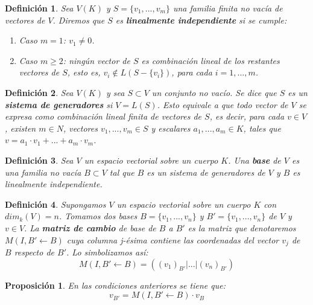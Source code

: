 \documentclass[a4paper,11pt, oneside]{book}
\newtheorem{defi}{Definición}
\newtheorem{prop}{Proposición}
\begin{document}
\begin{defi}
	Sea $V(K)$ y $S = \{v_1,...,v_m\}$ una familia finita no vacía de vectores de $V$. Diremos que $S$ es \textbf{linealmente independiente} si se cumple:
	\begin{enumerate}
		\item Caso $m=1$: $v_1 \neq 0$.
		\item Caso $m \geq 2$: ningún vector de $S$ es combinación lineal de los restantes vectores de $S$, esto es, $v_i \notin L(S -\{v_i\})$, para cada $i=1,...,m$.
	\end{enumerate}
\end{defi}
\begin{defi}
	Sea $V(K)$ y sea $S \subset V$ un conjunto no vacío. Se dice que $S$ es un \textbf{sistema de generadores} si $V = L(S)$. Esto equivale a que todo vector de $V$ se expresa como combinación lineal finita de vectores de $S$, es decir, para cada $v \in V$, existen $m \in N$, vectores $v_1,...,v_m \in S$ y escalares $a_1,...,a_m \in K$, tales que $v = a_1\cdot v_1+...+a_m\cdot v_m$.
\end{defi}
\begin{defi}
	Sea $V$ un espacio vectorial sobre un cuerpo $K$. Una \textbf{base} de $V$ es una familia no vacía $B \subset V$ tal que $B$ es un sistema de generadores de $V$ y $B$ es linealmente independiente.
\end{defi}
\begin{defi}
	Supongamos $V$ un espacio vectorial sobre un cuerpo $K$ con $dim_k(V) = n$. Tomamos dos bases $B = \{v_1,...,v_n\}$ y $B' = \{v_1,...,v_n\}$ de $V$ y $ v \in V$. La \textbf{matriz de cambio} de base de $B$ a $B'$ es la matriz que denotaremos $M(I, B' \leftarrow B)$ cuya columna j-ésima contiene las coordenadas del vector $v_j$ de $B$ respecto de $B'$. Lo simbolizamos así:
	\begin{equation}
	M(I, B' \leftarrow B) = ((v_1)_{B'} | ... |(v_n)_{B'})
	\end{equation}
\end{defi}
\begin{prop}
	En las condiciones anteriores se tiene que:
	\begin{equation}
	v_{B'} = M(I, B' \leftarrow B)\cdot  v_B
	\end{equation}
\end{prop}
\end{document}
